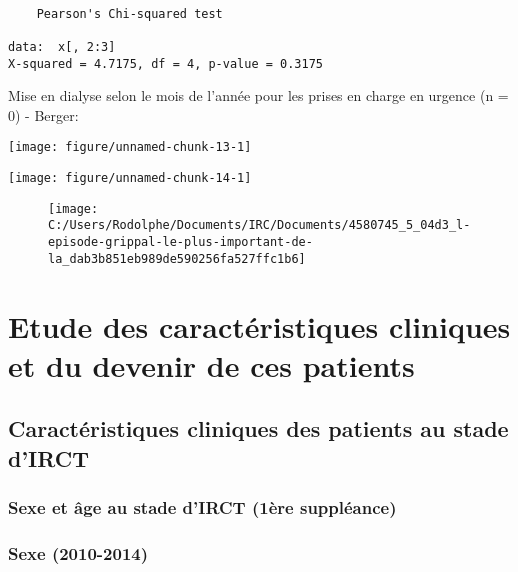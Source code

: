 \documentclass[11pt,a4paper]{article}\usepackage[]{graphicx}\usepackage[]{color}
\makeatletter
\def\maxwidth{ %
  \ifdim\Gin@nat@width>\linewidth
    \linewidth
  \else
    \Gin@nat@width
  \fi
}
\newenvironment{kframe}{%
 \def\at@end@of@kframe{}%
 \ifinner\ifhmode%
  \def\at@end@of@kframe{\end{minipage}}%
  \begin{minipage}{\columnwidth}%
 \fi\fi%
 \def\FrameCommand##1{\hskip\@totalleftmargin \hskip-\fboxsep
 \colorbox{shadecolor}{##1}\hskip-\fboxsep
     \hskip-\linewidth \hskip-\@totalleftmargin \hskip\columnwidth}%
 \MakeFramed {\advance\hsize-\width
   \@totalleftmargin\z@ \linewidth\hsize
   \@setminipage}}%
 {\par\unskip\endMakeFramed%
 \at@end@of@kframe}
\newenvironment{knitrout}{}{} %
\makeatother
\begin{document}
\begin{knitrout}
\color{fgcolor}\begin{kframe}
\begin{verbatim}

	Pearson's Chi-squared test

data:  x[, 2:3]
X-squared = 4.7175, df = 4, p-value = 0.3175
\end{verbatim}
\end{kframe}
\end{knitrout}


Mise en dialyse selon le mois de l'année pour les prises en charge en urgence (n = 0) - Berger:



\begin{knitrout}
\color{fgcolor}
\texttt{[image: figure/unnamed-chunk-13-1]} 

\end{knitrout}

\begin{knitrout}
\color{fgcolor}
\texttt{[image: figure/unnamed-chunk-14-1]} 

\end{knitrout}

\begin{figure}[H]
	\centering
	\texttt{[image: C:/Users/Rodolphe/Documents/IRC/Documents/4580745\_5\_04d3\_l-episode-grippal-le-plus-important-de-la\_dab3b851eb989de590256fa527ffc1b6]}
\end{figure}

\section{Etude des caractéristiques cliniques et du devenir de ces patients}

  \subsection{Caractéristiques cliniques des patients au stade d’IRCT}
  
    \subsubsection{Sexe et âge au stade d’IRCT (1ère suppléance)}

\subsubsection*{Sexe (2010-2014)}
\end{document}
